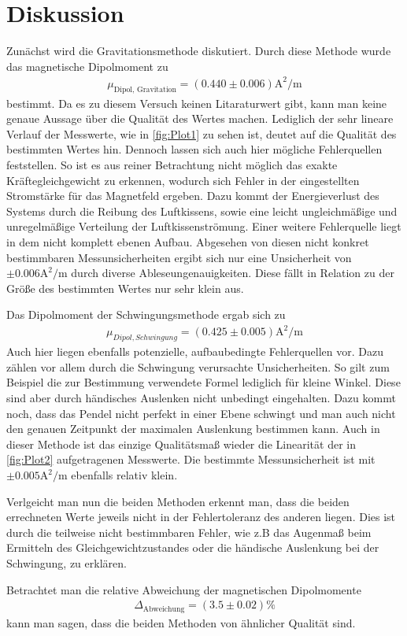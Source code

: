 \section{Diskussion}
\label{sec:Diskussion}
Zunächst wird die Gravitationsmethode diskutiert. Durch diese Methode wurde das magnetische Dipolmoment zu
\begin{align*}
    \mu_{\text{Dipol, Gravitation}} = (0.440 \pm 0.006)\unit{\ampere\squared\per\metre}
\end{align*}
bestimmt. Da es zu diesem Versuch keinen Litaraturwert gibt, kann man keine genaue Aussage über die Qualität des 
Wertes machen. Lediglich der sehr lineare Verlauf der Messwerte, wie in \autoref{fig:Plot1} zu sehen ist, deutet auf die Qualität des bestimmten Wertes hin. 
Dennoch lassen sich auch hier mögliche Fehlerquellen feststellen. So ist es aus reiner Betrachtung nicht möglich das exakte Kräftegleichgewicht zu erkennen, wodurch sich Fehler in der 
eingestellten Stromstärke für das Magnetfeld ergeben. Dazu kommt der Energieverlust des Systems durch die Reibung des Luftkissens, sowie eine leicht ungleichmäßige und unregelmäßige
Verteilung der Luftkissenströmung. Einer weitere Fehlerquelle liegt in dem nicht komplett ebenen Aufbau.
Abgesehen von diesen nicht konkret bestimmbaren Messunsicherheiten ergibt sich nur eine Unsicherheit von $\pm 0.006 \unit{\ampere\squared\per\metre}$ durch 
diverse Ableseungenauigkeiten. Diese fällt in Relation zu der Größe des bestimmten Wertes nur sehr klein aus.

Das Dipolmoment der Schwingungsmethode ergab sich zu
\begin{align*} 
    \mu_{Dipol, Schwingung} = (0.425 \pm 0.005)\unit{\ampere\squared\per\metre}
\end{align*}   
Auch hier liegen ebenfalls potenzielle, aufbaubedingte Fehlerquellen vor. Dazu zählen vor allem durch die Schwingung verursachte Unsicherheiten.
So gilt zum Beispiel die zur Bestimmung verwendete Formel lediglich für kleine Winkel. Diese sind aber durch 
händisches Auslenken nicht unbedingt eingehalten. Dazu kommt noch, dass das Pendel nicht perfekt in einer Ebene schwingt und man auch nicht den genauen Zeitpunkt der 
maximalen Auslenkung bestimmen kann. Auch in dieser Methode ist das einzige Qualitätsmaß wieder die Linearität der in \autoref{fig:Plot2} aufgetragenen Messwerte. 
Die bestimmte Messunsicherheit ist mit $\pm 0.005\unit{\ampere\squared\per\metre}$ ebenfalls relativ klein. 


Verlgeicht man nun die beiden Methoden erkennt man, dass die beiden errechneten Werte jeweils nicht in der Fehlertoleranz des anderen liegen. Dies ist durch die teilweise nicht 
bestimmbaren Fehler, wie z.B das Augenmaß beim  Ermitteln des Gleichgewichtzustandes oder die händische Auslenkung bei der Schwingung, zu erklären.


Betrachtet man die relative Abweichung der magnetischen Dipolmomente 
\begin{align*}
    \Delta_{\text{Abweichung}} = (3.5 \pm 0.02)\%
\end{align*}
kann man sagen, dass die beiden Methoden von ähnlicher Qualität sind.  